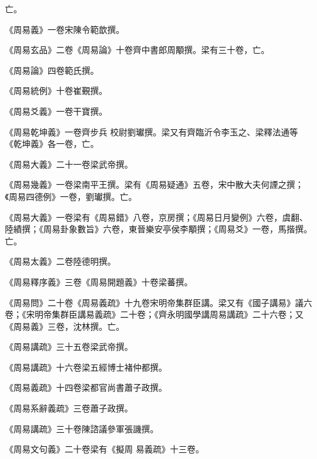 \begin{pinyinscope}
 亡。



 《周易義》一卷宋陳令範歆撰。



 《周易玄品》二卷《周易論》十卷齊中書郎周顒撰。梁有三十卷，亡。



 《周易論》四卷範氏撰。



 《周易統例》十卷崔覲撰。



 《周易爻義》一卷干寶撰。



 《周易乾坤義》一卷齊步兵
 校尉劉瓛撰。梁又有齊臨沂令李玉之、梁釋法通等《乾坤義》各一卷，亡。



 《周易大義》二十一卷梁武帝撰。



 《周易幾義》一卷梁南平王撰。梁有《周易疑通》五卷，宋中散大夫何諲之撰；《周易四德例》一卷，劉瓛撰。亡。



 《周易大義》一卷梁有《周易錯》八卷，京房撰；《周易日月變例》六卷，虞翻、陸績撰；《周易卦象數旨》六卷，東晉樂安亭侯李顒撰；《周易爻》一卷，馬揩撰。亡。



 《周易太義》二卷陸德明撰。



 《周易釋序義》三卷《周易開題義》十卷梁蕃撰。



 《周易問》二十卷《周易義疏》十九卷宋明帝集群臣講。梁又有《國子講易》議六卷；《宋明帝集群臣講易義疏》二十卷；《齊永明國學講周易講疏》二十六卷；又《周易義》三卷，沈林撰。亡。



 《周易講疏》三十五卷梁武帝撰。



 《周易講疏》十六卷梁五經博士褚仲都撰。



 《周易義疏》十四卷梁都官尚書蕭子政撰。



 《周易系辭義疏》三卷蕭子政撰。



 《周易講疏》三十卷陳諮議參軍張譏撰。



 《周易文句義》二十卷梁有《擬周
 易義疏》十三卷。




\end{pinyinscope}
